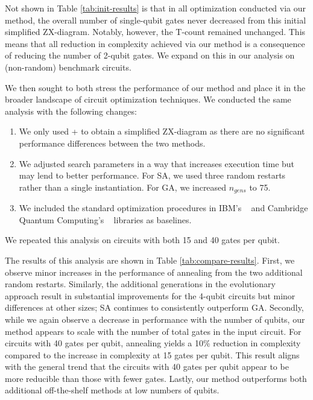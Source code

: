Not shown in Table \ref{tab:init-results} is that in all optimization conducted via our method, the overall number of single-qubit gates never decreased from this initial simplified ZX-diagram.
Notably, however, the T-count remained unchanged.
This means that all reduction in complexity achieved via our method is a consequence of reducing the number of 2-qubit gates.
We expand on this in our analysis on (non-random) benchmark circuits.

We then sought to both stress the performance of our method and place it in the broader landscape of circuit optimization techniques.
We conducted the same analysis with the following changes:
\begin{enumerate}
\item
  We only used  +  to obtain a simplified ZX-diagram as there are no significant performance differences between the two methods.
\item
  We adjusted search parameters in a way that increases execution time but may lend to better performance.
  For SA, we used three random restarts rather than a single instantiation.
  For GA, we increased $n_{gens}$ to 75.
\item
  We included the standard optimization procedures in IBM's ~\cite{Qiskit} and Cambridge Quantum Computing's ~\cite{sivarajah2020t} libraries as baselines.
\end{enumerate}
We repeated this analysis on circuits with both 15 and 40 gates per qubit.

The results of this analysis are shown in Table \ref{tab:compare-results}.
First, we observe minor increases in the performance of annealing from the two additional random restarts.
Similarly, the additional generations in the evolutionary approach result in substantial improvements for the 4-qubit circuits but minor differences at other sizes;
SA continues to consistently outperform GA.
Secondly, while we again observe a decrease in performance with the number of qubits, our method appears to scale with the number of total gates in the input circuit.
For circuits with 40 gates per qubit, annealing yields a 10\% reduction in complexity compared to the increase in complexity at 15 gates per qubit.
This result aligns with the general trend that the circuits with 40 gates per qubit appear to be more reducible than those with fewer gates.
Lastly, our method outperforms both additional off-the-shelf methods at low numbers of qubits.

